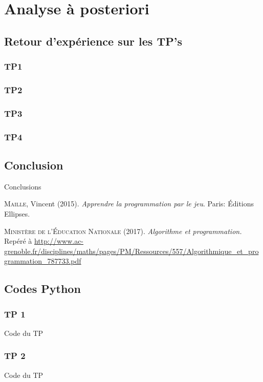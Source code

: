\documentclass[a4paper, 12pt, appendixprefix=true]{scrreprt}%
\begin{document}
\part{Analyse à posteriori}

\chapter{Retour d'expérience sur les TP's}
\section{TP1}

\section{TP2}

\section{TP3}

\section{TP4}

\chapter{Conclusion}
Conclusions

\begin{thebibliography}{9}
	\textsc{Maille}, Vincent (2015).
	\textit{Apprendre la programmation par le jeu}. Paris: Éditions Ellipses.
	
	\textsc{Ministère de l'Éducation Nationale} (2017).
	\textit{Algorithme et programmation.} Repéré à \url{http://www.ac-grenoble.fr/disciplines/maths/pages/PM/Ressources/557/Algorithmique_et_programmation_787733.pdf}
\end{thebibliography}

\appendix
\chapter{Codes Python}

\section{TP 1}
Code du TP 

\section{TP 2}
Code du TP 
\end{document}
